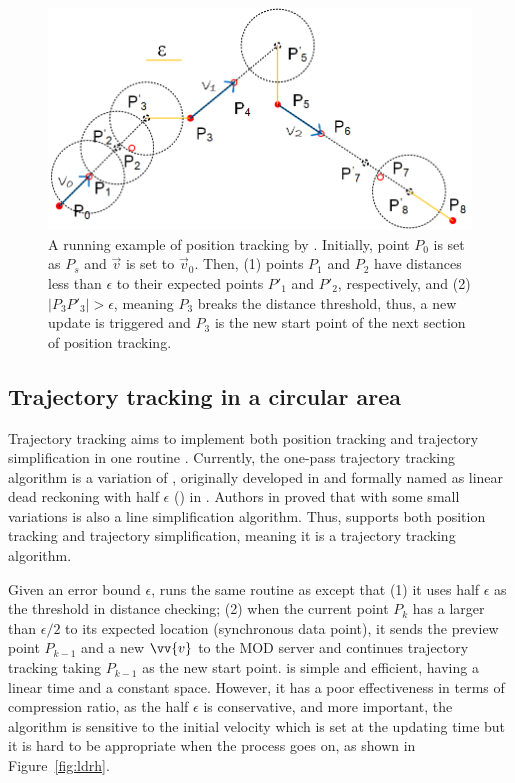 
\begin{figure}[tb!]
	\centering
	\includegraphics[scale=0.9]{figures/Fig-LDR.png}
	\vspace{-1ex}
	\caption{\small A running example of position tracking by \ldr. Initially, point $P_0$ is set as $P_s$ and $\vec{v}$ is set to $\vec{v}_0$. Then, (1) points $P_1$ and $P_2$ have \sed distances less than $\epsilon$ to their expected points $P'_1$ and $P'_2$, respectively, and (2) $|P_3P'_3| > \epsilon$, meaning $P_3$ breaks the distance threshold, thus, a new update is triggered and $P_3$ is the new start point of the next section of position tracking.}
	\vspace{-2ex}
	\label{fig:ldr}
\end{figure}



\subsection{Trajectory tracking in a circular area}
Trajectory tracking aims to implement both position tracking and trajectory simplification in one routine \cite{Lange:Tracking}. Currently, the one-pass trajectory tracking algorithm is a variation of \ldr, originally developed in \cite{Trajcevski:LDRH} and formally named as linear dead reckoning with half $\epsilon$ (\ldrh) in \cite{Lange:Tracking}.
%
Authors in \cite{Trajcevski:LDRH} proved that \ldr with some small variations is also a line simplification algorithm. Thus, \ldrh supports both position tracking and trajectory simplification, meaning it is a trajectory tracking algorithm.

Given an error bound $\epsilon$, \ldrh runs the same routine as \ldr except that (1) it uses half $\epsilon$ as the threshold in distance checking; (2) when the current point $P_k$ has a \sed larger than $\epsilon/2$ to its expected location (synchronous data point), it sends the preview point $P_{k-1}$ and a new $\vv{v}$ to the MOD server and continues trajectory tracking taking $P_{k-1}$ as the new start point. \ldrh is simple and efficient, having a linear time and a constant space. However, it has a poor effectiveness in terms of compression ratio, as the half $\epsilon$ is conservative, and more important, the algorithm is sensitive to the initial velocity which is set at the updating time but it is hard to be appropriate when the process goes on, as shown in Figure~\ref{fig:ldrh}.

